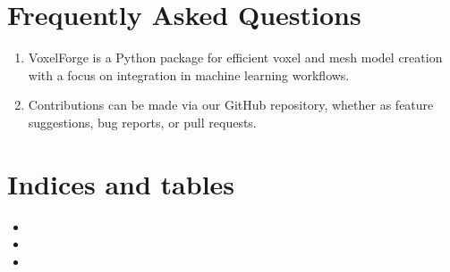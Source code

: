 \documentclass[letterpaper,10pt,english]{sphinxmanual}
\begin{document}
\sphinxstepscope


\chapter{Frequently Asked Questions}
\label{\detokenize{faq:frequently-asked-questions}}\label{\detokenize{faq::doc}}\begin{enumerate}
%
\item {} 
\sphinxAtStartPar
{}

\sphinxAtStartPar
VoxelForge is a Python package for efficient voxel and mesh model creation with a focus on integration in machine learning workflows.

\item {} 
\sphinxAtStartPar
{}

\sphinxAtStartPar
Contributions can be made via our GitHub repository, whether as feature suggestions, bug reports, or pull requests.

\end{enumerate}


\chapter{Indices and tables}
\label{\detokenize{index:indices-and-tables}}\begin{itemize}
\item {} 
\sphinxAtStartPar
{}

\item {} 
\sphinxAtStartPar
{}

\item {} 
\sphinxAtStartPar
{}

\end{itemize}


\renewcommand{\indexname}{Python Module Index}
\begin{sphinxtheindex}
\let\bigletter\sphinxstyleindexlettergroup
\bigletter{v}
\item\relax{}
\item\relax{}
\item\relax{}
\end{sphinxtheindex}

\renewcommand{\indexname}{Index}
\printindex
\end{document}
